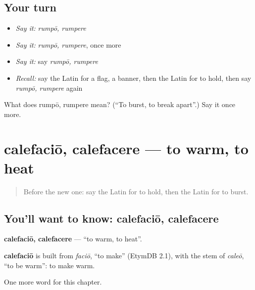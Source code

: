\subsection*{Your turn}
\begin{itemize}
\raggedright
  \item \emph{Say it:} \emph{rumpō, rumpere}
  \item \emph{Say it:} \emph{rumpō, rumpere}, once more
  \item \emph{Say it:} say \emph{rumpō, rumpere}
  \item \emph{Recall:} say the Latin for a flag, a banner, then the Latin for to hold, then say \emph{rumpō, rumpere} again
\end{itemize}

\begin{tcolorbox}[breakable,colback=teal!4,colframe=teal!35!black,title={Before you move on}]
What does rumpō, rumpere mean? (\textquotedblleft{}To burst, to break apart\textquotedblright{}.) Say it once more.
\end{tcolorbox}
\section[calefaciō, calefacere]{calefaciō, calefacere — to warm, to heat}

\label{lesson:LA-C255-calefacio}



\begin{quote}
Before the new one: say the Latin for to hold, then the Latin for to burst.
\end{quote}

\subsection*{You'll want to know: calefaciō, calefacere}
\textbf{calefaciō, calefacere} — \textquotedblleft{}to warm, to heat\textquotedblright{}.

\begin{cousinweb}
\textbf{calefaciō} is built from \emph{faciō}, \textquotedblleft{}to make\textquotedblright{} (EtymDB 2.1), with the stem of \emph{caleō}, \textquotedblleft{}to be warm\textquotedblright{}: to make warm.
\end{cousinweb}

\begin{grammarlens}[title={What you've built}]
One more word for this chapter.
\end{grammarlens}

